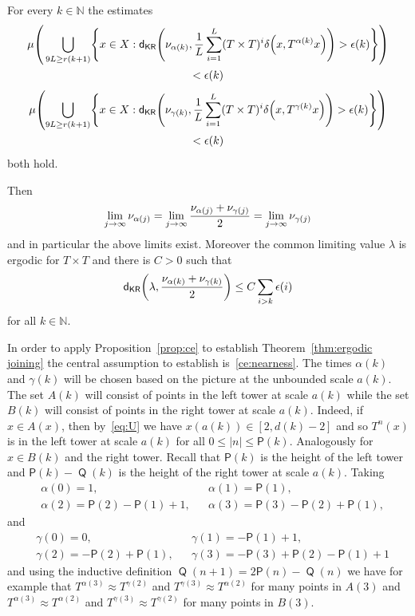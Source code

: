 \documentclass[10pt]{amsart}
\theoremstyle{definition}\newtheorem{defi}[theo]{Definition}\newtheorem{rema}[theo]{Remark}\newtheorem{exam}[theo]{Example}\newtheorem{exem}[theo]{Example}\newtheorem{nota}[theo]{Notation}
\DeclareMathOperator{\Q}{\mathsf{Q}}
\newcommand{\N}{\mathbb{N}}
\newcommand{\metric}{\mathsf{d}}
\newcommand{\KR}{\mathsf{KR}}
\renewcommand{\P}{\mathsf{P}}
\let\originalleft\left
\let\originalright\right
\renewcommand{\left}{\mathopen{}\mathclose\bgroup\originalleft}
\renewcommand{\right}{\aftergroup\egroup\originalright}
\renewcommand*{\to}{\mathchoice{\longrightarrow}{\rightarrow}{\rightarrow}{\rightarrow}}
\begin{document}
\begin{prop}
\begin{enumerate}
For every $k \in \N$ the estimates
\begin{multline}\label{eq:ce changed}
\mu \left(\, \bigcup_{9L \ge r(k+1)} \left\{ x \in X : \metric_\KR \left(\nu_{\alpha(k)}, \frac{1}{L} \sum_{i=1}^L (T \times T)^i \delta\left(x,T^{\alpha(k)} x\right) \right) > \epsilon(k) \right\} \right) \\ < \epsilon(k)
\end{multline}
\begin{multline}\label{eq:ce changed 2}
\mu \left(\bigcup_{9L \ge r(k+1)} \left\{ x \in X : \metric_\KR \left(\nu_{\gamma(k)}, \frac{1}{L} \sum_{i=1}^L (T \times T)^i \delta\left(x,T^{\gamma(k)} x\right) \right) > \epsilon(k) \right\} \right)\\ 
< \epsilon(k)
\end{multline}
both hold.
\end{enumerate}
Then
\[
\lim_{j \to \infty} \nu_{\alpha(j)} = \lim_{j \to \infty} \frac{\nu_{\alpha(j)} + \nu_{\gamma(j)}}{2} = \lim_{j \to \infty} \nu_{\gamma(j)}
\]
and in particular the above limits exist. Moreover the common limiting value $\lambda$ is ergodic for $T \times T$ and there is $C > 0$ such that
\[
\metric_\KR \left(\lambda, \frac{\nu_{\alpha(k)} + \nu_{\gamma(k)}}{2} \right) \le C \sum_{i > k} \epsilon(i)
\]
for all $k \in \N$.
\end{prop}


In order to apply Proposition~\ref{prop:ce} to establish Theorem~\ref{thm:ergodic joining} the central assumption to establish is~\eqref{ce:nearness}. The times $\alpha(k)$ and $\gamma(k)$ will be chosen based on the picture at the unbounded scale $a(k)$. The set $A(k)$ will consist of points in the left tower at scale $a(k)$ while the set $B(k)$ will consist of points in the right tower at scale $a(k)$. Indeed, if $x \in A(x)$, then by~\eqref{eq:U} we have $x(a(k))\in [2,d(k)-2]$ and so $T^n(x)$ is in the left tower at scale $a(k)$ for all $0\leq |n|\leq \P(k)$. Analogously for $x \in B(k)$ and the right tower. Recall that $\P(k)$ is the height of the left tower and $\P(k) - \Q(k)$ is the height of the right tower at scale $a(k)$. Taking
\begin{align*}
&\alpha(0) = 1,
&&\alpha(1) = \P(1),
\\
&\alpha(2) = \P(2) - \P(1) + 1,
&&\alpha(3) = \P(3) - \P(2) + \P(1),
\end{align*}
and
\begin{align*}
&\gamma(0) = 0,
&&\gamma(1) = - \P(1) + 1,
\\
&\gamma(2) = - \P(2) + \P(1),
&&\gamma(3) = -\P(3) + \P(2) - \P(1) + 1
\end{align*}
and using the inductive definition $\Q(n+1) = 2\P(n) - \Q(n)$ we have for example that $T^{\alpha(3)} \approx T^{\gamma(2)}$ and $T^{\gamma(3)} \approx T^{\alpha(2)}$ for many points in $A(3)$ and $T^{\alpha(3)} \approx T^{\alpha(2)}$ and $T^{\gamma(3)} \approx T^{\gamma(2)}$ for many points in $B(3)$.
\end{document}
